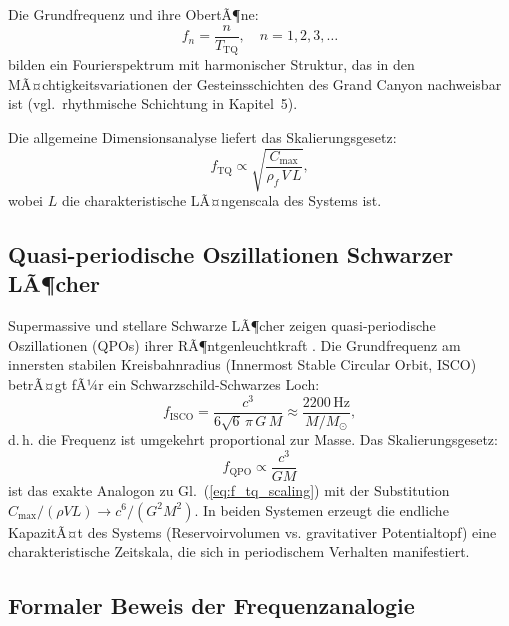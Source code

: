 ﻿\documentclass[12pt,a4paper]{report}
\begin{document}
Die Grundfrequenz und ihre ObertÃ¶ne:
\begin{equation}
	f_n = \frac{n}{T_{\mathrm{TQ}}}, \quad n = 1, 2, 3, \ldots
	\label{eq:frequenzen_tq}
\end{equation}
bilden ein Fourierspektrum mit harmonischer Struktur, das in den MÃ¤chtigkeitsvariationen der Gesteinsschichten des Grand Canyon nachweisbar ist (vgl.\ rhythmische Schichtung in Kapitel~5).

Die allgemeine Dimensionsanalyse liefert das Skalierungsgesetz:
\begin{equation}
	f_{\mathrm{TQ}} \propto \sqrt{\frac{C_{\max}}{\rho_f\, V\, L}},
	\label{eq:f_tq_scaling}
\end{equation}
wobei $L$ die charakteristische LÃ¤ngenscala des Systems ist.

\subsection{Quasi-periodische Oszillationen Schwarzer LÃ¶cher}

Supermassive und stellare Schwarze LÃ¶cher zeigen quasi-periodische Oszillationen (QPOs) ihrer RÃ¶ntgenleuchtkraft \cite{strohmayer2001}. Die Grundfrequenz am innersten stabilen Kreisbahnradius (Innermost Stable Circular Orbit, ISCO) betrÃ¤gt fÃ¼r ein Schwarzschild-Schwarzes Loch:
\begin{equation}
	f_{\mathrm{ISCO}} = \frac{c^3}{6\sqrt{6}\,\pi\,G\,M} \approx \frac{2200\,\mathrm{Hz}}{M/M_\odot},
	\label{eq:f_isco}
\end{equation}
d.\,h. die Frequenz ist umgekehrt proportional zur Masse. Das Skalierungsgesetz:
\begin{equation}
	f_{\mathrm{QPO}} \propto \frac{c^3}{GM}
	\label{eq:f_qpo_scaling}
\end{equation}
ist das exakte Analogon zu Gl.~(\ref{eq:f_tq_scaling}) mit der Substitution $C_{\max}/(\rho V L) \to c^6/(G^2 M^2)$. In beiden Systemen erzeugt die endliche KapazitÃ¤t des Systems (Reservoirvolumen vs. gravitativer Potentialtopf) eine charakteristische Zeitskala, die sich in periodischem Verhalten manifestiert.

\subsection{Formaler Beweis der Frequenzanalogie}
\end{document}
